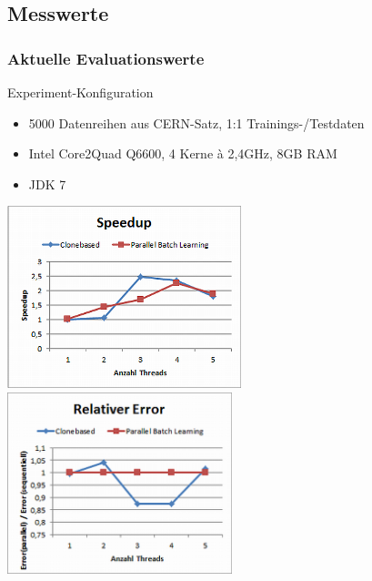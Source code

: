 \documentclass[18pt]{beamer}
\begin{document}
	
	\subsection{Messwerte}
	\begin{frame}\frametitle{Aktuelle Evaluationswerte}
		\begin{block}{Experiment-Konfiguration}
			\begin{itemize}
				\item 5000 Datenreihen aus CERN-Satz, 1:1 Trainings-/Testdaten
				\item Intel Core2Quad Q6600, 4 Kerne à 2,4GHz, 8GB RAM
				\item JDK 7
			\end{itemize}
		\end{block}
		\includegraphics[width=0.51\textwidth]{images/eval_speedup.png}
		\includegraphics[width=0.49\textwidth]{images/eval_error.png}
		
	\end{frame}
\end{document}
